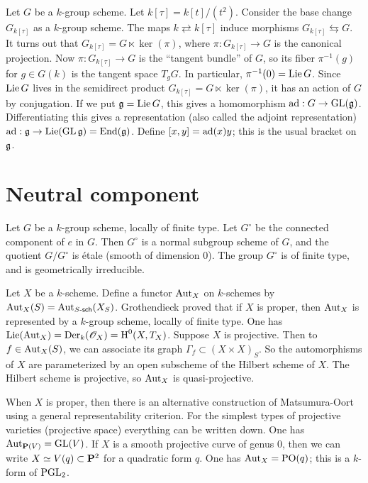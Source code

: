 \documentclass{article}
\begin{document}
Let $G$ be a $k$-group scheme. Let $k[\tau]=k[t]/(t^2)$. Consider the base 
change $G_{k[\tau]}$ as a $k$-group scheme. The maps $k\rightleftarrows k[\tau]$ 
induce morphisms $G_{k[\tau]} \leftrightarrows G$. It turns out that 
$G_{k[\tau]} = G\ltimes \ker(\pi)$, where $\pi:G_{k[\tau]} \to G$ is the canonical 
projection. Now $\pi:G_{k[\tau]}\to G$ is the ``tangent bundle'' of 
$G$, so its fiber $\pi^{-1}(g)$ for $g\in G(k)$ is the tangent space 
$T_g G$. In particular, $\pi^{-1}(0) = \operatorname{Lie} G$. Since $\operatorname{Lie} G$ lives in the 
semidirect product $G_{k[\tau]} = G\ltimes \ker(\pi)$, it has an action of 
$G$ by conjugation. If we put $\mathfrak{g}=\operatorname{Lie} G$, this gives a homomorphism 
$\operatorname{ad}:G\to \operatorname{GL}(\mathfrak{g})$. Differentiating this gives a representation 
(also called the adjoint representation) 
$\operatorname{ad}:\mathfrak{g} \to \operatorname{Lie}(\operatorname{GL}\mathfrak{g}) = \operatorname{End}(\mathfrak{g})$. Define 
$[x,y] = \operatorname{ad}(x) y$; this is the usual bracket on $\mathfrak{g}$. 


\section{Neutral component}

Let $G$ be a $k$-group scheme, locally of finite type. Let $G^\circ$ be the 
connected component of $e$ in $G$. Then $G^\circ$ is a normal subgroup scheme 
of $G$, and the quotient $G/G^\circ$ is \'etale (smooth of dimension $0$). The 
group $G^\circ$ is of finite type, and is geometrically irreducible. 

\begin{example}
Let $X$ be a $k$-scheme. Define a functor $\operatorname{Aut}_X$ on $k$-schemes 
by $\operatorname{Aut}_X(S) = \operatorname{Aut}_{S\textnormal{-}\mathsf{sch}}(X_S)$. 
Grothendieck proved that if $X$ is proper, then $\operatorname{Aut}_X$ is represented by a 
$k$-group scheme, locally of finite type. One has 
$\operatorname{Lie}(\operatorname{Aut}_X) = \operatorname{Der}_k(\mathscr{O}_X) = \operatorname{H}^0(X,T_X)$. Suppose 
$X$ is projective. Then to $f\in \operatorname{Aut}_X(S)$, we can associate its 
graph $\Gamma_f\subset (X\times X)_S$. So the automorphisms of $X$ are 
parameterized by an open subscheme of the Hilbert scheme of $X$. The Hilbert 
scheme is projective, so $\operatorname{Aut}_X$ is quasi-projective. 
\end{example}

When $X$ is proper, then there is an alternative construction of 
Matsumura-Oort using a general representability criterion. 
For the simplest types of projective varieties (projective space) everything 
can be written down. One has $\operatorname{Aut}_{\mathbf{P}(V)} = \operatorname{GL}(V)$. 
If $X$ is a smooth projective curve of genus $0$, then we can write 
$X\simeq V(q)\subset \mathbf{P}^2$ for a quadratic form $q$. One has 
$\operatorname{Aut}_X=\operatorname{PO}(q)$; this is a $k$-form of 
$\operatorname{PGL}_2$. 
\end{document}
